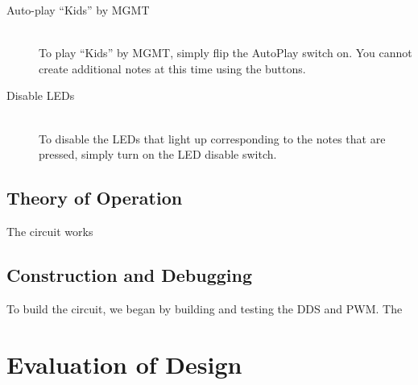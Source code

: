 \documentclass{article}
\begin{document}
\begin{description}
      \item[Auto-play ``Kids'' by MGMT] \hfill \\
        To play ``Kids'' by MGMT, simply flip the AutoPlay switch on. You cannot create additional notes at this time using the buttons.

      \item[Disable LEDs] \hfill \\
        To disable the LEDs that light up corresponding to the notes that are pressed, simply turn on the LED disable switch.
        
    \end{description}

  \subsection{Theory of Operation}
  

    The circuit works

  \subsection{Construction and Debugging}


    To build the circuit, we began by building and testing the DDS and PWM. The

\section{Evaluation of Design}
  
\end{document}
